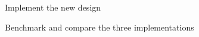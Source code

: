 \documentclass[E]{BAMASA}
\begin{document}
\begin{workpackage}{Implement the new design}\label{wp:new-design}
    
\end{workpackage}

\begin{workpackage}{Benchmark and compare the three implementations}\label{wp:new-implementation}
    
\end{workpackage}


\gradingMA





\end{document}
